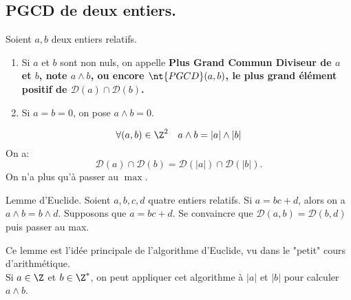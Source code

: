 \documentclass[11pt]{article}
\newcommand*{\PGCD}{\nt{PGCD}}
\renewcommand*{\D}{\mathcal{D}}
\begin{document}
\subsection{PGCD de deux entiers.}

\begin{defi}{}{}
    Soient $a,b$ deux entiers relatifs.
    \begin{enumerate}[topsep=0pt,itemsep=-0.9 ex]
        \item Si $a$ et $b$ sont non nuls, on appelle \bf{Plus Grand Commun Diviseur} de $a$ et $b$, note $a\land b$, ou encore $\PGCD(a,b)$, le plus grand élément positif de $\D(a)\cap\D(b)$.
        \item Si $a=b=0$, on pose $a\land b=0$.
    \end{enumerate}
\end{defi}

\begin{prop}{}{}
    \begin{equation*}
        \forall (a,b)\in\Z^2\quad a\land b = |a|\land|b|
    \end{equation*}
    \tcblower
    On a:
    \begin{equation*}
        \D(a)\cap\D(b)=\D(|a|)\cap\D(|b|).
    \end{equation*}
    On n'a plus qu'à passer au $\max$.
\end{prop}

\begin{prop}{Lemme d'Euclide.}{}
    Soient $a,b,c,d$ quatre entiers relatifs. Si $a=bc+d$, alors on a $a\land b=b\land d$.
    \tcblower
    Supposons que $a=bc+d$. Se convaincre que $\D(a,b)=\D(b,d)$ puis passer au max.
\end{prop}

\begin{meth}{}{}
    Ce lemme est l'idée principale de l'algorithme d'Euclide, vu dans le "petit" cours d'arithmétique.\\
    Si $a\in\Z$ et $b\in\Z^*$, on peut appliquer cet algorithme à $|a|$ et $|b|$ pour calculer $a\land b$.
\end{meth}
\end{document}
